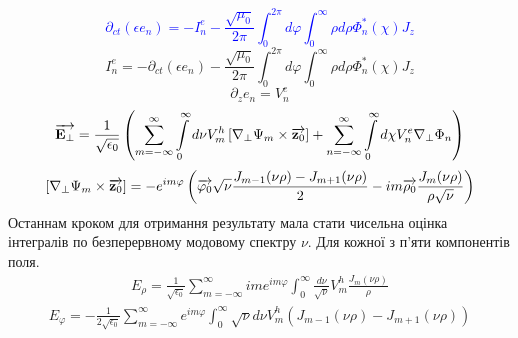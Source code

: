 %
\textcolor{blue}{ \begin{equation*}
\partial_{ct} (\epsilon e_n) = - I_n^e - 
\frac{\sqrt{\mu_0}}{2 \pi} \int_0^{2\pi} d \varphi 
\int_0^{\infty} \rho d \rho \Phi_n^* (\chi) J_z
\end{equation*} }
%
\begin{equation*}
I_n^e = - \partial_{ct} (\epsilon e_n) - 
\frac{\sqrt{\mu_0}}{2 \pi} \int_0^{2\pi} d \varphi 
\int_0^{\infty} \rho d \rho \Phi_n^* (\chi) J_z
\end{equation*}
%
\begin{equation*}
\partial_{z} e_n = V_n^e
\end{equation*}
%
\textcolor{blue} { \begin{equation*} \begin{aligned}
\overrightarrow{\mathbf E_\perp} = \frac{1}{\sqrt{\epsilon_0}} \left( 
\sum \limits_{m=-\infty}^{\infty} \int \limits_{0}^{\infty} 
d \nu V_m^h \left[  \nabla_\perp \Psi_m  \times  \overrightarrow{\mathbf z_0}  \right] +
\sum \limits_{n=-\infty}^{\infty} \int \limits_{0}^{\infty}
d \chi V_n^e \nabla_\perp \Phi_n \right)
\end{aligned} \end{equation*} }
%
\textcolor{blue} { \begin{equation*} \begin{aligned}
\left[  \nabla_\perp \Psi_m  \times  \overrightarrow{\mathbf z_0}  \right] = 
- e^{im\varphi} \left( \overrightarrow{\mathbf \varphi_0} \sqrt{\nu} 
\frac{J_{m-1} (\nu \rho) - J_{m+1} (\nu \rho)}{2} - 
i m \overrightarrow{\mathbf \rho_0} \frac{J_m (\nu \rho)}{ \rho \sqrt{\nu}} \right)
\end{aligned} \end{equation*} }
%
Останнам кроком для отримання результату мала стати чисельна оцінка 
інтегралів по безперервному модовому спектру $ \nu $. Для кожної з п'яти
компонентів поля.
%
\begin{equation*} \begin{aligned} \label{eq:KerrAmendErhoInit}
E_\rho = \frac{1}{\sqrt{\epsilon_0}} \sum_{m=-\infty}^{\infty} 
i m e^{im\varphi} \int_{0}^{\infty} \frac{d \nu}{\sqrt{\nu}} 
V_m^h \frac{J_m(\nu \rho)}{\rho}
\end{aligned} \end{equation*}
%
\begin{equation*} \begin{aligned}
E_\varphi = - \frac{1}{2 \sqrt{\epsilon_0}} \sum_{m=-\infty}^{\infty} 
e^{im\varphi} \int_{0}^{\infty} \sqrt{\nu} d \nu 
V_m^h \left( J_{m-1} (\nu \rho) - J_{m+1} (\nu \rho) \right)
\end{aligned} \end{equation*}
